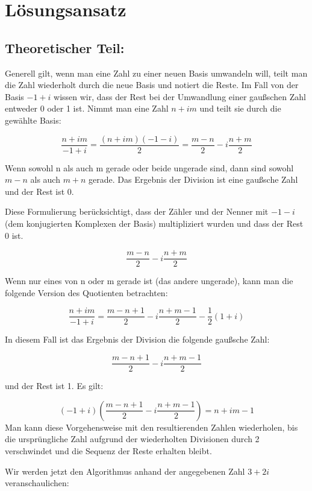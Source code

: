 \documentclass[course=erap]{aspdoc}
\begin{document}
    \section{Lösungsansatz}

    \subsection{Theoretischer Teil:}
    Generell gilt, wenn man eine Zahl zu einer neuen Basis umwandeln will, teilt man die Zahl wiederholt durch die neue Basis und notiert die Reste.
    Im Fall von der Basis $-1+i$ wissen wir, dass der Rest bei der Umwandlung einer gaußschen Zahl entweder 0 oder 1 ist.\cite{complex_base_conversion}
    \newpage
    Nimmt man eine Zahl $n + im$ und teilt sie durch die gewählte Basis:

    \[\frac{{n + im}}{{-1 + i}} = \frac{{(n + im)(-1 - i)}}{2} = \frac{{m - n}}{2} - i\frac{{n + m}}{2}\]

    Wenn sowohl n als auch m gerade oder beide ungerade sind, dann sind sowohl $m-n$ als auch $m+n$ gerade.
    Das Ergebnis der Division ist eine gaußsche Zahl und der Rest ist 0.

    Diese Formulierung berücksichtigt, dass der Zähler und der Nenner mit $-1-i$ (dem konjugierten Komplexen der Basis) multipliziert wurden und dass der Rest 0 ist.

    \[\frac{{m - n}}{{2}} - i\frac{{n + m}}{2}\]

    Wenn nur eines von n oder m gerade ist (das andere ungerade), kann man die folgende Version des Quotienten betrachten:

    \[\frac{{n + im}}{{-1 + i}} = \frac{{m - n + 1}}{2} - i \frac{{n + m -1}}{2} - \frac{{1}}{2}(1 + i)\]

    In diesem Fall ist das Ergebnis der Division die folgende gaußsche Zahl:

    \[\frac{{m - n + 1}}{{2}} - i\frac{{n + m - 1}}{2}\]

    und der Rest ist 1.
    Es gilt:

    \[(-1 +i) (\frac{m - n + 1}{2} - i \frac{n + m - 1}{2}) = n +im - 1\]
    Man kann diese Vorgehensweise mit den resultierenden Zahlen wiederholen, bis die ursprüngliche Zahl aufgrund der wiederholten Divisionen durch 2 verschwindet und die Sequenz der Reste erhalten bleibt.
    \newline

    Wir werden jetzt den Algorithmus anhand der angegebenen Zahl $3 + 2i$ veranschaulichen:
\end{document}
